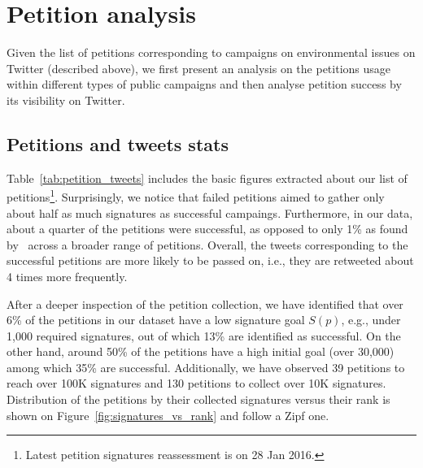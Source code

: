 \section{Petition analysis}
\label{sec:petition_analysis}

Given the list of petitions corresponding to campaigns on environmental issues on Twitter (described above), we first present an analysis on the petitions usage within different types of public campaigns and then analyse petition success by its visibility on Twitter.

\subsection{Petitions and tweets stats}
Table~\ref{tab:petition_tweets} includes the basic figures extracted about our list of petitions\footnote{Latest petition signatures reassessment is on 28 Jan 2016.}.
Surprisingly, we notice that failed petitions aimed to gather only about half as much signatures as successful campaings.
Furthermore, in our data, about a quarter of the petitions were successful, as opposed to only 1\% as found by~\citeauthor{Huang2015}  across a broader range of petitions.
Overall, the tweets corresponding to the successful petitions are more likely to be passed on, i.e., they are retweeted about 4 times more frequently.

After a deeper inspection of the petition collection, we have identified that over 6\% of the petitions in our dataset have a low signature goal $S(p)$, e.g., under 1,000 required signatures, out of which 13\% are identified as successful.
On the other hand, around 50\% of the petitions have a high initial goal (over 30,000) among which 35\% are successful.
Additionally, we have observed 39 petitions to reach over 100K signatures and 130 petitions to collect over 10K signatures.
Distribution of the petitions by their collected signatures versus their rank is shown on Figure~\ref{fig:signatures_vs_rank} and follow a Zipf one.

